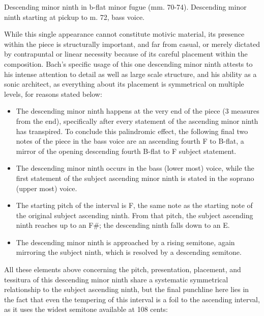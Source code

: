 \begin{Example}[H]
    \begin{center}
    \caption[Descending minor ninth in b-flat minor fugue (mm. 70-74). ]{ Descending minor ninth in b-flat minor fugue (mm. 70-74). Descending minor ninth starting at pickup to m. 72, bass voice.}
    \end{center}
\end{Example}
    
    While this single appearance cannot constitute motivic material, its
presence within the piece is structurally important, and far from
casual, or merely dictated by contrapuntal or linear necessity because
of its careful placement within the composition. Bach's specific usage
of this one descending minor ninth attests to his intense attention to
detail as well as large scale structure, and his ability as a sonic
architect, as everything about its placement is symmetrical on multiple
levels, for reasons stated below:

\begin{itemize}
\tightlist
\item
  The descending minor ninth happens at the very end of the piece (3
  measures from the end), specifically after every statement of the
  ascending minor ninth has transpired. To conclude this palindromic
  effect, the following final two notes of the piece in the bass voice
  are an ascending fourth F to B-flat, a mirror of the opening
  descending fourth B-flat to F subject statement.
\item
  The descending minor ninth occurs in the bass (lower most) voice,
  while the first statement of the subject ascending minor ninth is
  stated in the soprano (upper most) voice.
\item
  The starting pitch of the interval is F, the same note as the starting
  note of the original subject ascending ninth. From that pitch, the
  subject ascending ninth reaches up to an F\#; the descending ninth
  falls down to an E.
\item
  The descending minor ninth is approached by a rising semitone, again
  mirroring the subject ninth, which is resolved by a descending
  semitone.
\end{itemize}

All these elements above concerning the pitch, presentation, placement,
and tessitura of this descending minor ninth share a systematic
symmetrical relationship to the subject ascending ninth, but the final
punchline here lies in the fact that even the tempering of this interval
is a foil to the ascending interval, as it uses the widest semitone
available at 108 cents:

